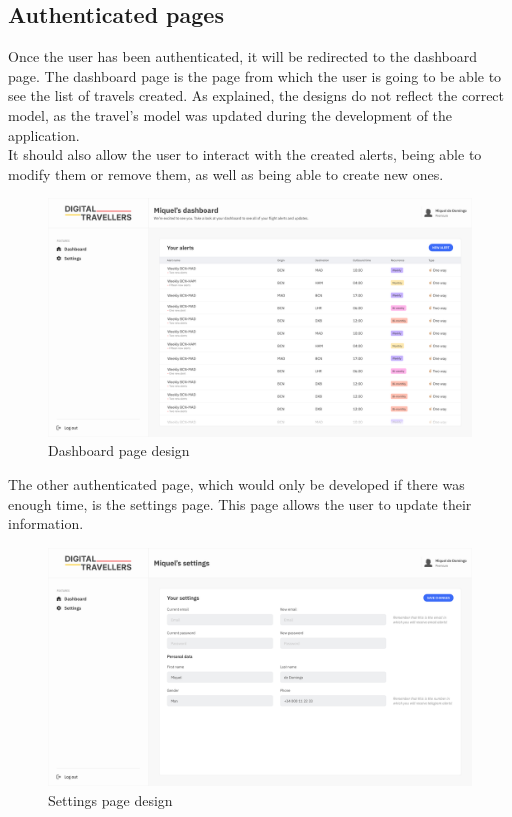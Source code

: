 \documentclass[./memory.tex]{subfiles}
\begin{document}
\subsection{Authenticated pages}
Once the user has been authenticated, it will be redirected to the dashboard
page. The dashboard page is the page from which the user is going to be able to
see the list of travels created. As explained, the designs do not reflect the
correct model, as the travel's model was updated during the development of the
application.
\\
It should also allow the user to interact with the created alerts, being able to
modify them or remove them, as well as being able to create new ones.
\begin{figure}[H]
	\centering
	\includegraphics[width=\textwidth]{./assets/designs/dashboard-desktop.png}
	\caption{Dashboard page design}
\end{figure}
\newpage
The other authenticated page, which would only be developed if there was enough
time, is the settings page. This page allows the user to update their
information.
\begin{figure}[H]
	\centering
	\includegraphics[width=\textwidth]{./assets/designs/settings-desktop.png}
	\caption{Settings page design}
\end{figure}
\newpage
\end{document}
